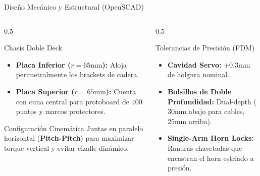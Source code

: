 \documentclass[10pt, aspectratio=169]{beamer}
\begin{document}
\begin{frame}{Diseño Mecánico y Estructural (OpenSCAD)}
    \begin{columns}
        \begin{column}{0.5\textwidth}
            \begin{block}{Chasis Doble Deck}
                \begin{itemize}
                    \item \textbf{Placa Inferior ($r=65\text{mm}$):} Aloja perimetralmente los brackets de cadera.
                    \item \textbf{Placa Superior ($r=65\text{mm}$):} Cuenta con cuna central para protoboard de 400 puntos y marcos protectores.
                \end{itemize}
            \end{block}
            \begin{block}{Configuración Cinemática}
                Juntas en paralelo horizontal (\textbf{Pitch-Pitch}) para maximizar torque vertical y evitar cizalle dinámico.
            \end{block}
        \end{column}
        \begin{column}{0.5\textwidth}
            \begin{alertblock}{Tolerancias de Precisión (FDM)}
                \begin{itemize}
                    \item \textbf{Cavidad Servo:} $+0.3\text{mm}$ de holgura nominal.
                    \item \textbf{Bolsillos de Doble Profundidad:} Dual-depth ($30\text{mm}$ abajo para cables, $25\text{mm}$ arriba).
                    \item \textbf{Single-Arm Horn Locks:} Ranuras chavetadas que encastran el horn estriado a presión.
                \end{itemize}
            \end{alertblock}
        \end{column}
    \end{columns}
\end{frame}
\end{document}
